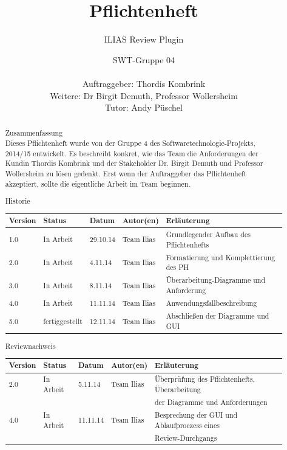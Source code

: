 \documentclass[a4paper]{scrreprt}
\begin{document}
 
\title{Pflichtenheft}
\subtitle{ILIAS Review Plugin}
\publishers{Version: 5.0, Status: Fertiggestellt}
\author{SWT-Gruppe 04\\ \\Auftraggeber: Thordis Kombrink\\Weitere: Dr Birgit Demuth, Professor Wollersheim\\Tutor: Andy Püschel}
\maketitle

\begin{abstract}
\Huge{Zusammenfassung}\\\normalsize
Dieses Pflichtenheft wurde von der Gruppe 4 des Softwaretechnologie-Projekts, 2014/15 entwickelt. Es beschreibt konkret, wie das Team die Anforderungen der Kundin Thordis Kombrink und der Stakeholder Dr. Birgit Demuth und Professor Wollersheim zu lösen gedenkt. Erst wenn der Auftraggeber das Pflichtenheft akzeptiert, sollte die eigentliche Arbeit im Team beginnen.
\vspace{1cm}
 
\huge{Historie}\\\normalsize
\begin{tabular}[c]{|l|l|l|l|l|}\hline
Version & Status & Datum & Autor(en) & Erläuterung\\\hline
1.0 & In Arbeit & 29.10.14 & Team Ilias & Grundlegender Aufbau des Pflichtenhefts\\\hline
2.0 & In Arbeit & 4.11.14 & Team Ilias & Formatierung und Komplettierung des PH \\\hline
3.0 & In Arbeit & 8.11.14 & Team Ilias & Überarbeitung-Diagramme und Anforderung \\\hline
4.0 & In Arbeit & 11.11.14 & Team Ilias & Anwendungsfallbeschreibung\\\hline
5.0 & fertiggestellt & 12.11.14 & Team Ilias & Abschließen der Diagramme und GUI\\\hline
\end{tabular}
\vspace{0.5cm}
 
\huge{Reviewnachweis}\\\normalsize
\begin{tabular}[c]{|l|l|l|l|l|}\hline
Version & Status & Datum & Autor(en) & Erläuterung\\\hline
2.0 & In Arbeit & 5.11.14 & Team Ilias & Überprüfung des Pflichtenhefts, Überarbeitung\\
&&&& der Diagramme und Anforderungen\\\hline
4.0 & In Arbeit & 11.11.14 & Team Ilias & Besprechung der GUI und Ablaufproezess eines\\
&&&& Review-Durchgangs\\\hline
\end{tabular}
\end{abstract}
\end{document}
